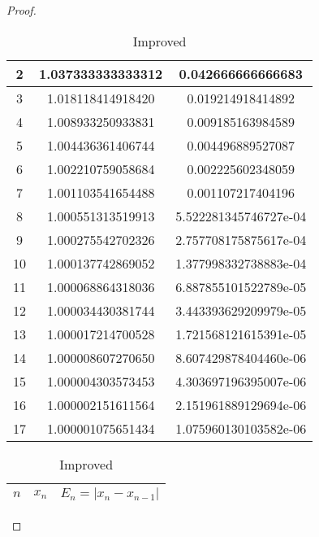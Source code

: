 \begin{enumerate}
\begin{proof}
\begin{table}[H]
\begin{subtable}[t]{.8\textwidth}
\begin{table}[htbp]
\begin{subtable}[t]{.49\linewidth}
\begin{tabular}[t]{|c|c|c|}
			\footnotesize	2	&	\footnotesize	1.037333333333312	&	\footnotesize	0.042666666666683	\\	\hline
			\footnotesize	3	&	\footnotesize	1.018118414918420	&	\footnotesize	0.019214918414892	\\	\hline
			\footnotesize	4	&	\footnotesize	1.008933250933831	&	\footnotesize	0.009185163984589	\\	\hline
			\footnotesize	5	&	\footnotesize	1.004436361406744	&	\footnotesize	0.004496889527087	\\	\hline
			\footnotesize	6	&	\footnotesize	1.002210759058684	&	\footnotesize	0.002225602348059	\\	\hline
			\footnotesize	7	&	\footnotesize	1.001103541654488	&	\footnotesize	0.001107217404196	\\	\hline
			\footnotesize	8	&	\footnotesize	1.000551313519913	&	\footnotesize	5.522281345746727e-04	\\	\hline
			\footnotesize	9	&	\footnotesize	1.000275542702326	&	\footnotesize	2.757708175875617e-04	\\	\hline
			\footnotesize	10	&	\footnotesize	1.000137742869052	&	\footnotesize	1.377998332738883e-04	\\	\hline
			\footnotesize	11	&	\footnotesize	1.000068864318036	&	\footnotesize	6.887855101522789e-05	\\	\hline
			\footnotesize	12	&	\footnotesize	1.000034430381744	&	\footnotesize	3.443393629209979e-05	\\	\hline
			\footnotesize	13	&	\footnotesize	1.000017214700528	&	\footnotesize	1.721568121615391e-05	\\	\hline
			\footnotesize	14	&	\footnotesize	1.000008607270650	&	\footnotesize	8.607429878404460e-06	\\	\hline
			\footnotesize	15	&	\footnotesize	1.000004303573453	&	\footnotesize	4.303697196395007e-06	\\	\hline
			\footnotesize	16	&	\footnotesize	1.000002151611564	&	\footnotesize	2.151961889129694e-06	\\	\hline
			\footnotesize	17	&	\footnotesize	1.000001075651434	&	\footnotesize	1.075960130103582e-06	\\	\hline
			\end{tabular}
		\end{subtable}
		\ifnum{}
			\begin{subtable}[t]{.8\textwidth}
			\centering
			\caption{Improved}
			\begin{tabular}{|c|c|c|}
				\hline
				$n$ & \(x_n\)				&	\(E_n=|x_n-x_{n-1}|\)	\\	\hline

\end{tabular}
\end{subtable}
\end{table}
\end{subtable}
\end{table}
\end{proof}
\end{enumerate}
